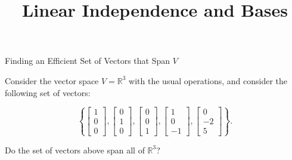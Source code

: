 \documentclass[xcolor=dvipsnames,aspectratio=169,t]{beamer}
\title{Linear Independence and Bases}
\begin{document}
\maketitle

\begin{frame}{Finding an Efficient Set of Vectors that Span $V$}

Consider the vector space $V = \mathbb{R}^3$ with the usual operations, and consider the following set of vectors:

\[ \left\{ \begin{bmatrix} 1 \\ 0 \\ 0 \end{bmatrix} ,  \begin{bmatrix} 0 \\ 1 \\ 0 \end{bmatrix} , \begin{bmatrix} 0 \\ 0 \\ 1 \end{bmatrix} , \begin{bmatrix} 1 \\ 0 \\ -1 \end{bmatrix}, \begin{bmatrix} 0 \\ -2 \\ 5 \end{bmatrix}  \right\} . \]


\bb
\ii Do the set of vectors above span all of $\mathbb{R}^3$? \ms

\pause
{}


\end{frame}
\end{document}
